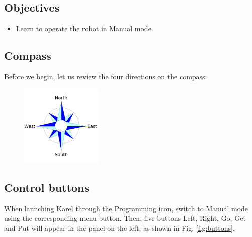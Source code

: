 \subsection{Objectives} 
\begin{itemize}
\item Learn to operate the robot in Manual mode.
\end{itemize}

\subsection{Compass}

Before we begin, let us review the four directions on the compass:\\[-7mm]

\begin{figure}[!ht]
\begin{center}
\includegraphics[width=0.35\textwidth]{img/compass.png}
\vspace{-0mm}
\end{center}
\vspace{-1cm}
\end{figure}

\subsection{Control buttons}

When launching Karel through the Programming icon, switch to Manual mode using the corresponding 
menu button. Then, five buttons Left, Right, Go, Get and Put will appear in the panel on the left,
as shown in Fig. \ref{fig:buttons}.


